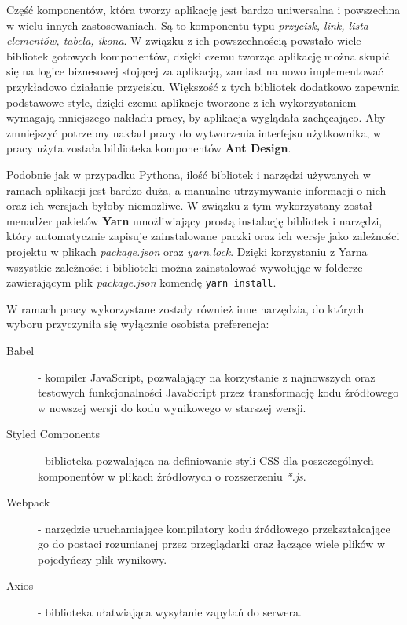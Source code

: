 Częś\'c komponentów, która tworzy aplikację jest bardzo uniwersalna i powszechna w wielu innych zastosowaniach.
Są to komponentu typu \textit{przycisk, link, lista elementów, tabela, ikona}. W związku z ich powszechnością
powstało wiele bibliotek gotowych komponentów, dzięki czemu tworząc aplikację można skupi\'c się na logice
biznesowej stojącej za aplikacją, zamiast na nowo implementowa\'c przykładowo działanie przycisku. Większoś\'c
z tych bibliotek dodatkowo zapewnia podstawowe style, dzięki czemu aplikacje tworzone z ich wykorzystaniem
wymagają mniejszego nakładu pracy, by aplikacja wyglądała zachęcająco. Aby zmniejszy\'c potrzebny nakład
pracy do wytworzenia interfejsu użytkownika, w pracy użyta została biblioteka komponentów \textbf{Ant Design}.
\newline

Podobnie jak w przypadku Pythona, iloś\'c bibliotek i narzędzi używanych w ramach aplikacji jest bardzo duża,
a manualne utrzymywanie informacji o nich oraz ich wersjach byłoby niemożliwe. W związku z tym wykorzystany
został menadżer pakietów \textbf{Yarn} umożliwiający prostą instalację bibliotek i narzędzi, który automatycznie
zapisuje zainstalowane paczki oraz ich wersje jako zależności projektu w plikach \textit{package.json} oraz
\textit{yarn.lock}. Dzięki korzystaniu z Yarna wszystkie zależności i biblioteki można zainstalowa\'c wywołując
w folderze zawierającym plik \textit{package.json} komendę \texttt{yarn install}.\newline

\noindent
W ramach pracy wykorzystane zostały również inne narzędzia, do których wyboru przyczyniła się wyłącznie
osobista preferencja:

\begin{description}
  \item[Babel] - kompiler JavaScript, pozwalający na korzystanie z najnowszych oraz testowych funkcjonalności
  JavaScript przez transformację kodu \'zródłowego w nowszej wersji do kodu wynikowego w starszej wersji.
  \item[Styled Components] - biblioteka pozwalająca na definiowanie styli CSS dla poszczególnych komponentów
  w plikach \'zródłowych o rozszerzeniu \textit{*.js}.
  \item[Webpack] - narzędzie uruchamiające kompilatory kodu \'zródłowego przekształcające go do postaci rozumianej
  przez przeglądarki oraz łączące wiele plików w pojedyńczy plik wynikowy.
  \item[Axios] - biblioteka ułatwiająca wysyłanie zapytań do serwera.
\end{description}

